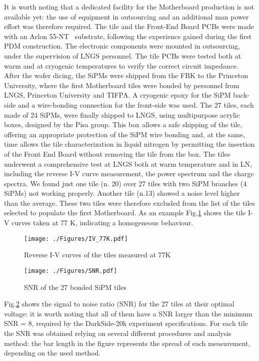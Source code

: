 It is worth noting that a dedicated facility for the Motherboard production is not available yet: the use of equipment in outsourcing and an additional man power effort was therefore required.
The tile and the Front-End Board PCBs were made with an Arlon 55-NT~\cite{Arlon:2018a} substrate, following the experience gained during the first PDM construction. The electronic components were mounted in outsourcing, under the supervision of LNGS personnel. The tile PCBs were tested both at warm and at cryogenic temperatures to verify the correct circuit impedance. After the wafer dicing, the SiPMs were shipped from the FBK to the Princeton University, where
the first Motherboard tiles were bonded by personnel from LNGS, Princeton University and TIFPA. A cryogenic epoxy for the SiPM back-side and a wire-bonding connection for the front-side was used. The 27 tiles, each made of 24 SiPMs, were finally shipped to LNGS, using multipurpose acrylic boxes, designed by the Pisa group. This box allows a safe shipping of the tile, offering an appropriate protection of the SiPM wire bonding and, at the same, time allows the tile characterization in liquid nitrogen by permitting the insertion of the Front End Board without removing the tile from the box. The tiles underwent a comprehensive test at LNGS both at warm temperature and in LN, including the reverse I-V curve measurement, the power spectrum and the charge spectra. We found just one tile 
(n. 20) over 27 tiles with two SiPM branches (4 SiPMs) not working properly. Another tile (n.13) showed a noise level higher than the average. These two tiles were therefore excluded from the list of the tiles selected to populate the first Motherboard.
As an example Fig.\ref{fig:I-V} shows the tile I-V curves taken at 77 K, indicating a homogeneous behaviour.  
\begin{figure} [t]
\texttt{[image: ./Figures/IV\_77K.pdf]}
\caption{Reverse I-V curves of the tiles measured at 77K}
\label{fig:I-V} 
\end{figure} 
\begin{figure} [t]
\texttt{[image: ./Figures/SNR.pdf]}
\caption{SNR of the 27 bonded SiPM tiles}
\label{fig:SNR} 
\end{figure} 
Fig.\ref{fig:SNR} shows the signal to noise ratio (SNR) for the 27 tiles at their optimal voltage: it is worth noting that all of them have a SNR larger than the minimum SNR = 8, required by the DarkSide-20k experiment specifications. For each tile the SNR was obtained relying on several different procedures and analysis method: the bar length in the figure represents the spread of each measurement, depending on the used method. 
